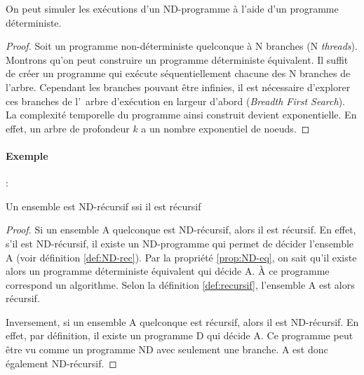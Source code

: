 \begin{myprop} \label{prop:ND-eq}
	On peut simuler les exécutions d'un ND-programme à l'aide d'un programme
	déterministe.
	\begin{proof}
		Soit un programme non-déterministe quelconque à N branches (N \textit{threads}).
		Montrons qu'on peut construire un programme déterministe équivalent.
		Il suffit de créer un programme qui exécute séquentiellement chacune des N branches de l'arbre.
		Cependant les branches pouvant être infinies, il est nécessaire d'explorer ces branches de l'\ arbre d'exécution en largeur d'abord (\textit{Breadth First Search}). La complexité temporelle du programme ainsi construit devient exponentielle.  En effet, un arbre de profondeur $k$ a un nombre exponentiel de noeuds.
	\end{proof}
\end{myprop}
\paragraph{Exemple} : \\
	

\begin{myprop}
	Un ensemble est ND-récursif ssi il est récursif
	\begin{proof}
		Si un ensemble A quelconque est ND-récursif, alors il est récursif.
		En effet, s'il est ND-récursif, il existe un ND-programme qui permet de décider l'ensemble A (voir définition \ref{def:ND-rec}).
		Par la propriété \ref{prop:ND-eq}, on sait qu'il existe alors un programme déterministe équivalent qui décide A. À ce programme correspond un algorithme.
		Selon la définition \ref{def:recursif}, l'ensemble A est alors récursif.

		Inversement, si un ensemble A quelconque est récursif, alors il est ND-récursif. En effet, par définition, il existe un programme D qui décide A.
		Ce programme peut être vu comme un programme ND avec seulement une branche. A est donc également ND-récursif.
	\end{proof}
\end{myprop}

